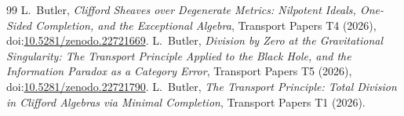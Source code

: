 \documentclass[11pt]{article}
\theoremstyle{definition}
\theoremstyle{plain}
\begin{document}
\begin{thebibliography}{99}
 L.~Butler,
\emph{Clifford Sheaves over Degenerate Metrics: Nilpotent Ideals, One-Sided Completion, and the Exceptional Algebra},
Transport Papers T4 (2026), doi:\href{https://doi.org/10.5281/zenodo.22721669}{10.5281/zenodo.22721669}.
 L.~Butler,
\emph{Division by Zero at the Gravitational Singularity: The Transport Principle Applied to the Black Hole, and the Information Paradox as a Category Error},
Transport Papers T5 (2026), doi:\href{https://doi.org/10.5281/zenodo.22721790}{10.5281/zenodo.22721790}.
 L.~Butler,
\emph{The Transport Principle: Total Division in Clifford Algebras via Minimal Completion},
Transport Papers T1 (2026).
\end{thebibliography}
\end{document}
